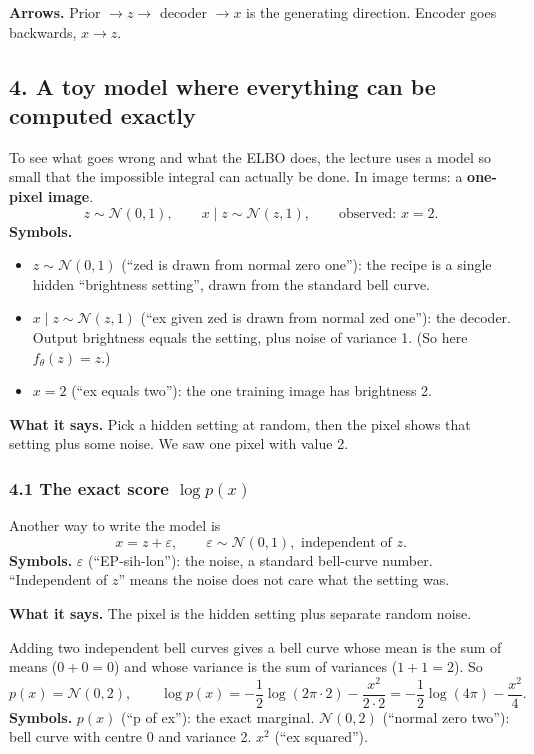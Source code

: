 \textbf{Arrows.} Prior $\to z \to$ decoder $\to x$ is the generating direction. Encoder goes backwards, $x \to z$.

\subsection*{4. A toy model where everything can be computed exactly}

To see what goes wrong and what the ELBO does, the lecture uses a model so small that the impossible integral can actually be done. In image terms: a \textbf{one-pixel image}.
\[
z \sim \mathcal{N}(0, 1), \qquad x \mid z \sim \mathcal{N}(z, 1), \qquad \text{observed: } x = 2.
\]
\textbf{Symbols.}
\begin{itemize}[leftmargin=1.5em, itemsep=0pt]
\item $z \sim \mathcal{N}(0,1)$ (``zed is drawn from normal zero one''): the recipe is a single hidden ``brightness setting'', drawn from the standard bell curve.
\item $x \mid z \sim \mathcal{N}(z, 1)$ (``ex given zed is drawn from normal zed one''): the decoder. Output brightness equals the setting, plus noise of variance 1. (So here $f_\theta(z) = z$.)
\item $x = 2$ (``ex equals two''): the one training image has brightness 2.
\end{itemize}
\textbf{What it says.} Pick a hidden setting at random, then the pixel shows that setting plus some noise. We saw one pixel with value 2.

\subsubsection*{4.1 The exact score $\log p(x)$}

Another way to write the model is
\[
x = z + \varepsilon, \qquad \varepsilon \sim \mathcal{N}(0, 1), \text{ independent of } z.
\]
\textbf{Symbols.} $\varepsilon$ (``EP-sih-lon''): the noise, a standard bell-curve number. ``Independent of $z$'' means the noise does not care what the setting was.

\textbf{What it says.} The pixel is the hidden setting plus separate random noise.

Adding two independent bell curves gives a bell curve whose mean is the sum of means ($0 + 0 = 0$) and whose variance is the sum of variances ($1 + 1 = 2$). So
\[
p(x) = \mathcal{N}(0, 2),
\qquad
\log p(x) = -\frac{1}{2}\log(2\pi \cdot 2) - \frac{x^2}{2 \cdot 2} = -\frac{1}{2}\log(4\pi) - \frac{x^2}{4}.
\]
\textbf{Symbols.} $p(x)$ (``p of ex''): the exact marginal. $\mathcal{N}(0, 2)$ (``normal zero two''): bell curve with centre 0 and variance 2. $x^2$ (``ex squared'').

